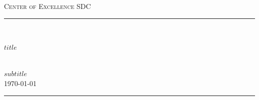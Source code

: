 %
%
%
% 


	\newcommand{\HRule}{\rule{\linewidth}{0.5mm}} %
	
	\center %
	
	
	\textsc{\LARGE Center of Excellence SDC}\\[1.5cm] %
	
	
	
	
	\HRule\\[0.4cm]
	
	{\huge\bfseries{} \rule[-0.25cm]{0pt}{0.25cm}$title$}\\[0.4cm] %
	{\large\bfseries{} $subtitle$}\\[0.4cm]
	{\large\monthyeardate\today}\\[0.4cm] %

	\HRule\\[1.5cm]
	
	
